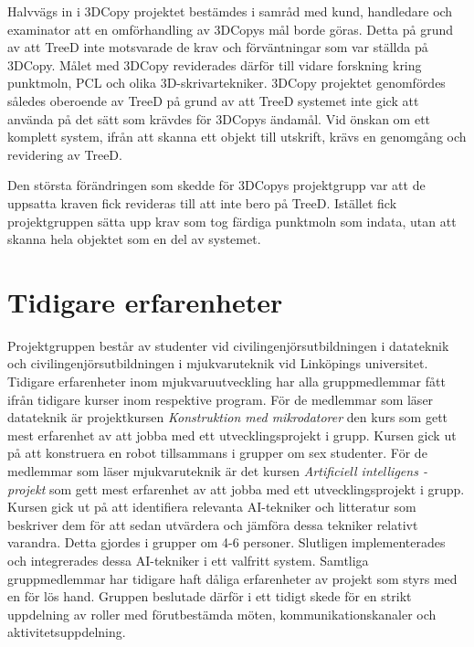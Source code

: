 Halvvägs in i 3DCopy projektet bestämdes i samråd med kund, handledare och examinator att en omförhandling av 3DCopys mål borde göras. Detta på grund av att TreeD inte motsvarade de krav och förväntningar som var ställda på 3DCopy. Målet med 3DCopy reviderades därför till vidare forskning kring punktmoln, PCL och olika 3D-skrivartekniker. 3DCopy projektet genomfördes således oberoende av TreeD på grund av att TreeD systemet inte gick att använda på det sätt som krävdes för 3DCopys ändamål. Vid önskan om ett komplett system, ifrån att skanna ett objekt till utskrift, krävs en genomgång och revidering av TreeD.

Den största förändringen som skedde för 3DCopys projektgrupp var att de uppsatta kraven fick revideras till att inte bero på TreeD. Istället fick projektgruppen sätta upp krav som tog färdiga punktmoln som indata, utan att skanna hela objektet som en del av systemet.

\section{Tidigare erfarenheter}
Projektgruppen består av studenter vid civilingenjörsutbildningen i datateknik och civilingenjörsutbildningen i mjukvaruteknik vid Linköpings universitet. Tidigare erfarenheter inom mjukvaruutveckling har alla gruppmedlemmar fått ifrån tidigare kurser inom respektive program. För de medlemmar som läser datateknik är projektkursen \textit{Konstruktion med mikrodatorer} den kurs som gett mest erfarenhet av att jobba med ett utvecklingsprojekt i grupp. Kursen gick ut på att konstruera en robot tillsammans i grupper om sex studenter. För de medlemmar som läser mjukvaruteknik är det kursen \textit{Artificiell intelligens - projekt} som gett mest erfarenhet av att jobba med ett utvecklingsprojekt i grupp. Kursen gick ut på att identifiera relevanta AI-tekniker och litteratur som beskriver dem för att sedan utvärdera och jämföra dessa tekniker relativt varandra. Detta gjordes i grupper om 4-6 personer. Slutligen implementerades och integrerades dessa AI-tekniker i ett valfritt system. Samtliga gruppmedlemmar har tidigare haft dåliga erfarenheter av projekt som styrs med en för lös hand. Gruppen beslutade därför i ett tidigt skede för en strikt uppdelning av roller med förutbestämda möten, kommunikationskanaler och aktivitetsuppdelning.

